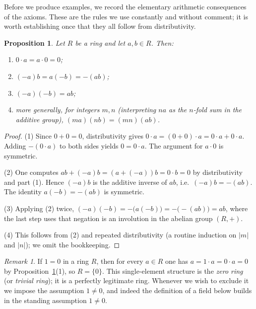 \documentclass[11pt,a4paper]{article}
\newtheorem{proposition}[theorem]{Proposition}
\theoremstyle{definition}
\theoremstyle{remark}
\newtheorem{remark}[theorem]{Remark}
\begin{document}
Before we produce examples, we record the elementary arithmetic consequences of the axioms. These are the rules we use constantly and without comment; it is worth establishing once that they all follow from distributivity.

\begin{proposition}\label{ringsfields:prop-arith}
Let \(R\) be a ring and let \(a,b\in R\). Then:
\begin{enumerate}
\item \(0\cdot a = a\cdot 0 = 0\);
\item \((-a)b = a(-b) = -(ab)\);
\item \((-a)(-b) = ab\);
\item more generally, for integers \(m,n\) (interpreting \(na\) as the \(n\)-fold sum in the additive group), \((ma)(nb) = (mn)(ab)\).
\end{enumerate}
\end{proposition}

\begin{proof}
(1) Since \(0+0=0\), distributivity gives \(0\cdot a = (0+0)\cdot a = 0\cdot a + 0\cdot a\). Adding \(-(0\cdot a)\) to both sides yields \(0 = 0\cdot a\). The argument for \(a\cdot 0\) is symmetric.

(2) One computes \(ab + (-a)b = (a + (-a))b = 0\cdot b = 0\) by distributivity and part (1). Hence \((-a)b\) is the additive inverse of \(ab\), i.e.\ \((-a)b = -(ab)\). The identity \(a(-b) = -(ab)\) is symmetric.

(3) Applying (2) twice, \((-a)(-b) = -\bigl(a(-b)\bigr) = -\bigl(-(ab)\bigr) = ab\), where the last step uses that negation is an involution in the abelian group \((R,+)\).

(4) This follows from (2) and repeated distributivity (a routine induction on \(|m|\) and \(|n|\)); we omit the bookkeeping.
\end{proof}

\begin{remark}\label{ringsfields:rem-zeroring}
If \(1 = 0\) in a ring \(R\), then for every \(a\in R\) one has \(a = 1\cdot a = 0\cdot a = 0\) by Proposition~\ref{ringsfields:prop-arith}(1), so \(R=\{0\}\). This single-element structure is the \emph{zero ring} (or \emph{trivial ring}); it is a perfectly legitimate ring. Whenever we wish to exclude it we impose the assumption \(1\neq 0\), and indeed the definition of a field below builds in the standing assumption \(1\neq 0\).
\end{remark}
\end{document}
